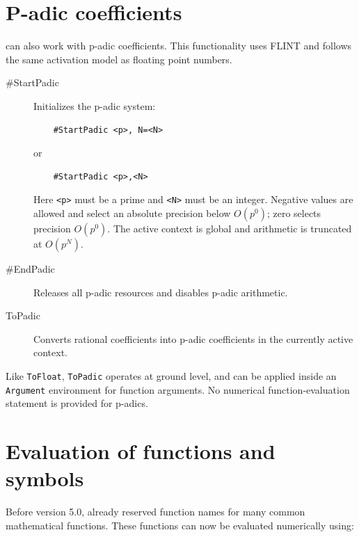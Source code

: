 \section{P-adic coefficients}
\FORM{} can also work with p-adic coefficients. This functionality uses FLINT
and follows the same activation model as floating point numbers.
\begin{description}
\item[\#StartPadic] Initializes the p-adic system:
\begin{verbatim}
    #StartPadic <p>, N=<N>
\end{verbatim}
or
\begin{verbatim}
    #StartPadic <p>,<N>
\end{verbatim}
Here \texttt{<p>} must be a prime and \texttt{<N>} must be an integer. Negative
values are allowed and select an absolute precision below $O(p^0)$; zero
selects precision $O(p^0)$.
The active context is global and arithmetic is truncated at $O(p^N)$.
\item[\#EndPadic] Releases all p-adic resources and disables p-adic arithmetic.
\item[ToPadic] Converts rational coefficients into p-adic coefficients in the
currently active context.
\end{description}
Like \texttt{ToFloat}, \texttt{ToPadic} operates at ground level, and can be
applied inside an \texttt{Argument} environment for function arguments.
No numerical function-evaluation statement is provided for p-adics.

\section{Evaluation of functions and symbols}
Before version 5.0, \FORM{} already reserved function names for many common mathematical
functions. These functions can now be evaluated numerically using:

